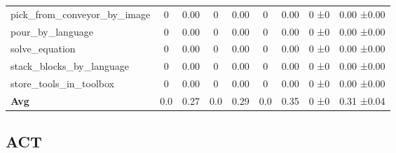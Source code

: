 \begin{table}[H]
{\begin{tabular}{l|c|c|c|c|c|c|c|c}
pick\_from\_conveyor\_by\_image & 0 & 0.00 & 0 & 0.00 & 0 & 0.00 & 0 ±0 & 0.00 ±0.00 \\
pour\_by\_language & 0 & 0.00 & 0 & 0.00 & 0 & 0.00 & 0 ±0 & 0.00 ±0.00 \\
solve\_equation & 0 & 0.00 & 0 & 0.00 & 0 & 0.00 & 0 ±0 & 0.00 ±0.00 \\
stack\_blocks\_by\_language & 0 & 0.00 & 0 & 0.00 & 0 & 0.00 & 0 ±0 & 0.00 ±0.00 \\
store\_tools\_in\_toolbox & 0 & 0.00 & 0 & 0.00 & 0 & 0.00 & 0 ±0 & 0.00 ±0.00 \\
\hline
\textbf{Avg} & 0.0 & 0.27 & 0.0 & 0.29 & 0.0 & 0.35 & 0 ±0 & 0.31 ±0.04 \\
\hline
\end{tabular}
}
\end{table}
\subsection{ACT}
\label{part:act}

